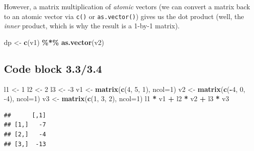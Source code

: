\documentclass[
]{book}
\newenvironment{Shaded}{\begin{snugshade}}{\end{snugshade}}
\newcommand{\DataTypeTok}[1]{\textcolor[rgb]{0.13,0.29,0.53}{#1}}
\newcommand{\DecValTok}[1]{\textcolor[rgb]{0.00,0.00,0.81}{#1}}
\newcommand{\KeywordTok}[1]{\textcolor[rgb]{0.13,0.29,0.53}{\textbf{#1}}}
\newcommand{\NormalTok}[1]{#1}
\newcommand{\OperatorTok}[1]{\textcolor[rgb]{0.81,0.36,0.00}{\textbf{#1}}}
\newcommand{\StringTok}[1]{\textcolor[rgb]{0.31,0.60,0.02}{#1}}
\begin{document}
However, a matrix multiplication of \emph{atomic} vectors (we can convert a matrix back to an atomic vector via \texttt{c()} or \texttt{as.vector()}) gives us the dot product (well, the \emph{inner} product, which is why the result is a 1-by-1 matrix).

\begin{Shaded}
\begin{Highlighting}[]
\NormalTok{dp \textless{}{-}}\StringTok{ }\KeywordTok{c}\NormalTok{(v1) }\OperatorTok{\%*\%}\StringTok{ }\KeywordTok{as.vector}\NormalTok{(v2)}
\end{Highlighting}
\end{Shaded}

\hypertarget{code-block-3.33.4}{%
\subsection*{Code block 3.3/3.4}\label{code-block-3.33.4}}

\begin{Shaded}
\begin{Highlighting}[]
\NormalTok{l1 \textless{}{-}}\StringTok{ }\DecValTok{1}
\NormalTok{l2 \textless{}{-}}\StringTok{ }\DecValTok{2}
\NormalTok{l3 \textless{}{-}}\StringTok{ }\DecValTok{{-}3}
\NormalTok{v1 \textless{}{-}}\StringTok{ }\KeywordTok{matrix}\NormalTok{(}\KeywordTok{c}\NormalTok{(}\DecValTok{4}\NormalTok{, }\DecValTok{5}\NormalTok{, }\DecValTok{1}\NormalTok{), }\DataTypeTok{ncol=}\DecValTok{1}\NormalTok{)}
\NormalTok{v2 \textless{}{-}}\StringTok{ }\KeywordTok{matrix}\NormalTok{(}\KeywordTok{c}\NormalTok{(}\OperatorTok{{-}}\DecValTok{4}\NormalTok{, }\DecValTok{0}\NormalTok{, }\DecValTok{{-}4}\NormalTok{), }\DataTypeTok{ncol=}\DecValTok{1}\NormalTok{)}
\NormalTok{v3 \textless{}{-}}\StringTok{ }\KeywordTok{matrix}\NormalTok{(}\KeywordTok{c}\NormalTok{(}\DecValTok{1}\NormalTok{, }\DecValTok{3}\NormalTok{, }\DecValTok{2}\NormalTok{), }\DataTypeTok{ncol=}\DecValTok{1}\NormalTok{)}
\NormalTok{l1 }\OperatorTok{*}\StringTok{ }\NormalTok{v1 }\OperatorTok{+}\StringTok{ }\NormalTok{l2 }\OperatorTok{*}\StringTok{ }\NormalTok{v2 }\OperatorTok{+}\StringTok{ }\NormalTok{l3 }\OperatorTok{*}\StringTok{ }\NormalTok{v3}
\end{Highlighting}
\end{Shaded}

\begin{verbatim}
##      [,1]
## [1,]   -7
## [2,]   -4
## [3,]  -13
\end{verbatim}
\end{document}
